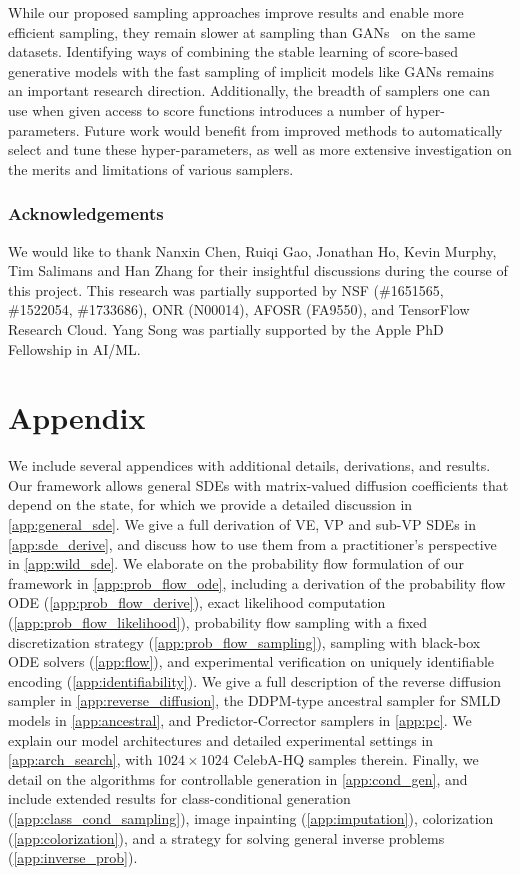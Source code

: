 \documentclass{article} %
\begin{document}
While our proposed sampling approaches improve results and enable more efficient sampling, they remain slower at sampling than GANs~\citep{goodfellow2014generative} on the same datasets. Identifying ways of combining the stable learning of score-based generative models with the fast sampling of implicit models like GANs remains an important research direction. Additionally, the breadth of samplers one can use when given access to score functions introduces a number of hyper-parameters. Future work would benefit from improved methods to automatically select and tune these hyper-parameters, as well as more extensive investigation on the merits and limitations of various samplers.

\subsubsection*{Acknowledgements}
We would like to thank Nanxin Chen, Ruiqi Gao, Jonathan Ho, Kevin Murphy, Tim Salimans and Han Zhang for their insightful discussions during the course of this project. This research was partially supported by NSF (\#1651565, \#1522054, \#1733686),
ONR (N00014), AFOSR (FA9550), and TensorFlow Research Cloud. Yang Song was partially supported by the Apple PhD Fellowship in AI/ML.



\appendix
\newpage
\section*{Appendix}
We include several appendices with additional details, derivations, and results.
Our framework allows general SDEs with matrix-valued diffusion coefficients that depend on the state, for which we provide a detailed discussion in \cref{app:general_sde}. We give a full derivation of VE, VP and sub-VP SDEs in \cref{app:sde_derive}, and discuss how to use them from a practitioner's perspective in \cref{app:wild_sde}. We elaborate on the probability flow formulation of our framework in \cref{app:prob_flow_ode}, including a derivation of the probability flow ODE (\cref{app:prob_flow_derive}), exact likelihood computation (\cref{app:prob_flow_likelihood}), probability flow sampling with a fixed discretization strategy (\cref{app:prob_flow_sampling}), sampling with black-box ODE solvers (\cref{app:flow}), and experimental verification on uniquely identifiable encoding (\cref{app:identifiability}). We give a full description of the reverse diffusion sampler in \cref{app:reverse_diffusion}, the DDPM-type ancestral sampler for SMLD models in \cref{app:ancestral}, and Predictor-Corrector samplers in \cref{app:pc}. We explain our model architectures and detailed experimental settings in \cref{app:arch_search}, with $1024\times 1024$ CelebA-HQ samples therein. Finally, we detail on the algorithms for controllable generation in \cref{app:cond_gen}, and include extended results for class-conditional generation (\cref{app:class_cond_sampling}), image inpainting (\cref{app:imputation}), colorization (\cref{app:colorization}), and a strategy for solving general inverse problems (\cref{app:inverse_prob}).
\end{document}
